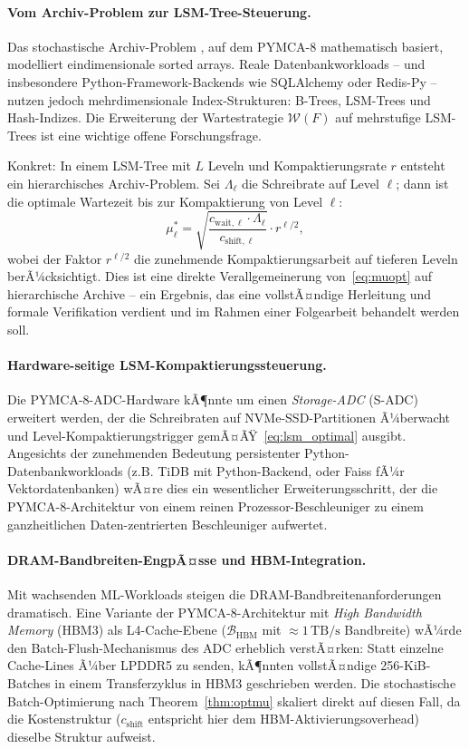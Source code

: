 ﻿\documentclass[a4paper,12pt]{scrreprt}
\theoremstyle{definition}
\begin{document}
	\paragraph{Vom Archiv-Problem zur LSM-Tree-Steuerung.}
	Das stochastische Archiv-Problem \cite{epp2026archiv}, auf dem PYMCA-8 mathematisch
	basiert, modelliert eindimensionale sorted arrays. Reale Datenbankworkloads --
	und insbesondere Python-Framework-Backends wie SQLAlchemy oder Redis-Py --
	nutzen jedoch mehrdimensionale Index-Strukturen: B-Trees, LSM-Trees und
	Hash-Indizes. Die Erweiterung der Wartestrategie $\mathcal{W}(F)$ auf
	mehrstufige LSM-Trees ist eine wichtige offene Forschungsfrage.

	Konkret: In einem LSM-Tree mit $L$ Leveln und Kompaktierungsrate $r$ entsteht
	ein hierarchisches Archiv-Problem. Sei $\Lambda_\ell$ die Schreibrate auf Level
	$\ell$; dann ist die optimale Wartezeit bis zur Kompaktierung von Level $\ell$:
	\begin{equation}
		\mu_\ell^* = \sqrt{\frac{c_{\mathrm{wait},\ell} \cdot \Lambda_\ell}{c_{\mathrm{shift},\ell}}}
		\cdot r^{\ell/2},
		\label{eq:lsm_optimal}
	\end{equation}
	wobei der Faktor $r^{\ell/2}$ die zunehmende Kompaktierungsarbeit auf tieferen
	Leveln berÃ¼cksichtigt. Dies ist eine direkte Verallgemeinerung von~\eqref{eq:muopt}
	auf hierarchische Archive -- ein Ergebnis, das eine vollstÃ¤ndige Herleitung und
	formale Verifikation verdient und im Rahmen einer Folgearbeit behandelt werden soll.

	\paragraph{Hardware-seitige LSM-Kompaktierungssteuerung.}
	Die PYMCA-8-ADC-Hardware kÃ¶nnte um einen \emph{Storage-ADC} (S-ADC) erweitert
	werden, der die Schreibraten auf NVMe-SSD-Partitionen Ã¼berwacht und
	Level-Kompaktierungstrigger gemÃ¤ÃŸ~\eqref{eq:lsm_optimal} ausgibt.
	Angesichts der zunehmenden Bedeutung persistenter Python-Datenbankworkloads
	(z.B. TiDB mit Python-Backend, oder Faiss fÃ¼r Vektordatenbanken) wÃ¤re dies
	ein wesentlicher Erweiterungsschritt, der die PYMCA-8-Architektur von einem
	reinen Prozessor-Beschleuniger zu einem ganzheitlichen Daten-zentrierten
	Beschleuniger aufwertet.

	\paragraph{DRAM-Band\-breiten-EngpÃ¤sse und HBM-Integration.}
	Mit wachsenden ML-Work\-loads steigen die DRAM-Bandbreitenanforderungen dramatisch.
	Eine Variante der PYMCA-8-Architektur mit \emph{High Bandwidth Memory} (HBM3)
	als L4-Cache-Ebene ($\mathcal{B}_\text{HBM}$ mit $\approx 1\,\mathrm{TB/s}$
	Bandbreite) wÃ¼rde den Batch-Flush-Mechanismus des ADC erheblich verstÃ¤rken:
	Statt einzelne Cache-Lines Ã¼ber LPDDR5 zu senden, kÃ¶nnten vollstÃ¤ndige
	256-KiB-Batches in einem Transferzyklus in HBM3 geschrieben werden.
	Die stochastische Batch-Optimierung nach Theorem~\ref{thm:optmu} skaliert
	direkt auf diesen Fall, da die Kostenstruktur ($c_{\mathrm{shift}}$ entspricht
	hier dem HBM-Aktivierungsoverhead) dieselbe Struktur aufweist.
\end{document}
